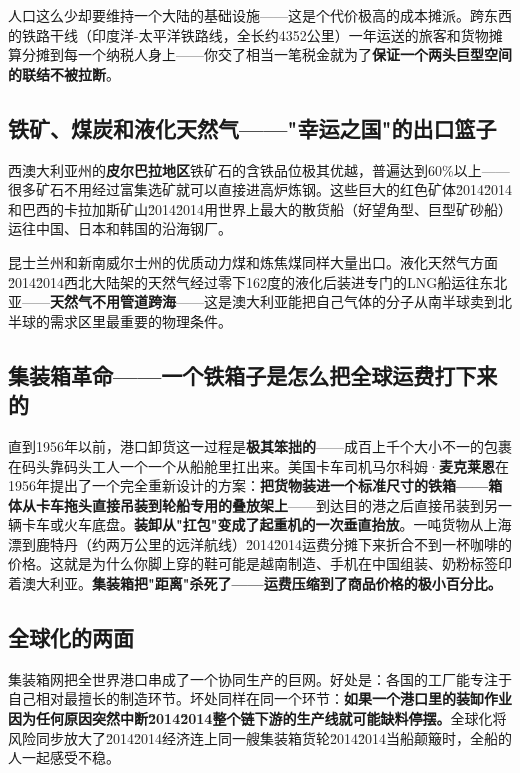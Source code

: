 \documentclass[a4paper,12pt]{ctexart}
\begin{document}
人口这么少却要维持一个大陆的基础设施——这是个代价极高的成本摊派。跨东西的铁路干线（印度洋-太平洋铁路线，全长约4352公里）一年运送的旅客和货物摊算分摊到每一个纳税人身上——你交了相当一笔税金就为了\textbf{保证一个两头巨型空间的联结不被拉断}。

\subsection*{铁矿、煤炭和液化天然气——"幸运之国"的出口篮子}

西澳大利亚州的\textbf{皮尔巴拉地区}铁矿石的含铁品位极其优越，普遍达到60\%以上——很多矿石不用经过富集选矿就可以直接进高炉炼钢。这些巨大的红色矿体\u2014\u2014和巴西的卡拉加斯矿山\u2014\u2014用世界上最大的散货船（好望角型、巨型矿砂船）运往中国、日本和韩国的沿海钢厂。

昆士兰州和新南威尔士州的优质动力煤和炼焦煤同样大量出口。液化天然气方面\u2014\u2014西北大陆架的天然气经过零下162度的液化后装进专门的LNG船运往东北亚——\textbf{天然气不用管道跨海}——这是澳大利亚能把自己气体的分子从南半球卖到北半球的需求区里最重要的物理条件。

\subsection*{集装箱革命——一个铁箱子是怎么把全球运费打下来的}

直到1956年以前，港口卸货这一过程是\textbf{极其笨拙的}——成百上千个大小不一的包裹在码头靠码头工人一个一个从船舱里扛出来。美国卡车司机马尔科姆·\textbf{麦克莱恩}在1956年提出了一个完全重新设计的方案：\textbf{把货物装进一个标准尺寸的铁箱——箱体从卡车拖头直接吊装到轮船专用的叠放架上}——到达目的港之后直接吊装到另一辆卡车或火车底盘。\textbf{装卸从"扛包"变成了起重机的一次垂直抬放}。一吨货物从上海漂到鹿特丹（约两万公里的远洋航线）\u2014\u2014运费分摊下来折合不到一杯咖啡的价格。这就是为什么你脚上穿的鞋可能是越南制造、手机在中国组装、奶粉标签印着澳大利亚。\textbf{集装箱把"距离"杀死了——运费压缩到了商品价格的极小百分比。}

\subsection*{全球化的两面}

集装箱网把全世界港口串成了一个协同生产的巨网。好处是：各国的工厂能专注于自己相对最擅长的制造环节。坏处同样在同一个环节：\textbf{如果一个港口里的装缷作业因为任何原因突然中断\u2014\u2014整个链下游的生产线就可能缺料停摆。}全球化将风险同步放大了\u2014\u2014经济连上同一艘集装箱货轮\u2014\u2014当船颠簸时，全船的人一起感受不稳。
\end{document}
